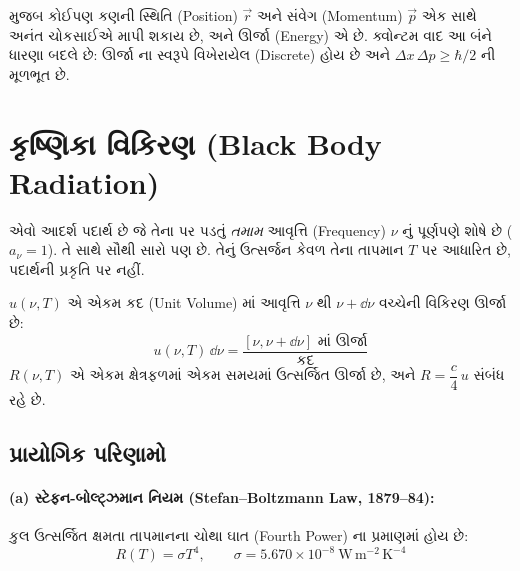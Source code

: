\begin{vyakhya}
 મુજબ કોઈપણ કણની સ્થિતિ (Position) $\vec r$ અને
સંવેગ (Momentum) $\vec p$ એક સાથે અનંત ચોકસાઈએ માપી શકાય છે, અને ઊર્જા (Energy) એ
 છે. ક્વોન્ટમ વાદ આ બંને ધારણા બદલે છે: ઊર્જા
 ના સ્વરૂપે વિખેરાયેલ (Discrete) હોય છે અને $\Delta x\,\Delta p\geq\hbar/2$
ની  મૂળભૂત છે.
\end{vyakhya}

\section{કૃષ્ણિકા વિકિરણ (Black Body Radiation)}

\begin{vyakhya}
 એવો આદર્શ પદાર્થ છે જે તેના પર પડતું \emph{તમામ} આવૃત્તિ (Frequency)
$\nu$ નું  પૂર્ણપણે શોષે છે (
$a_\nu=1$). તે સાથે સૌથી સારો  પણ છે. તેનું ઉત્સર્જન કેવળ તેના તાપમાન $T$ પર
આધારિત છે, પદાર્થની પ્રકૃતિ પર નહીં.
\end{vyakhya}

\begin{vyakhya}
 $u(\nu,T)$ એ એકમ કદ (Unit Volume)
માં આવૃત્તિ $\nu$ થી $\nu+\dd\nu$ વચ્ચેની વિકિરણ ઊર્જા છે:
\begin{equation}
  u(\nu,T)\,\dd\nu = \frac{\text{$[\nu,\nu+\dd\nu]$ માં ઊર્જા}}{\text{કદ}}
\end{equation}
 $R(\nu,T)$ એ એકમ ક્ષેત્રફળમાં એકમ સમયમાં
ઉત્સર્જિત ઊર્જા છે, અને $R = \dfrac{c}{4}\,u$ સંબંધ રહે છે.
\end{vyakhya}

\subsection{પ્રાયોગિક પરિણામો}

\paragraph{(a) સ્ટેફન-બોલ્ટ્ઝમાન નિયમ (Stefan--Boltzmann Law, 1879--84):}
કુલ ઉત્સર્જિત ક્ષમતા તાપમાનના ચોથા ઘાત (Fourth Power) ના પ્રમાણમાં હોય છે:
\begin{equation}
  R(T)=\sigma T^{4}, \qquad \sigma = 5.670\times10^{-8}\ \mathrm{W\,m^{-2}\,K^{-4}}
\end{equation}

